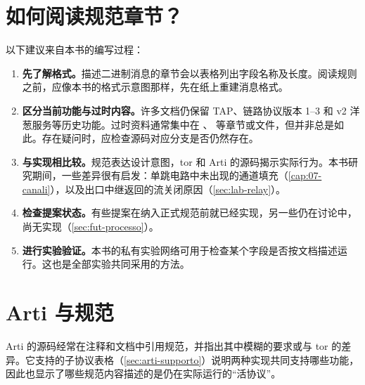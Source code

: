 \section{如何阅读规范章节？}\label{sec:C-lettura}

以下建议来自本书的编写过程：
\begin{enumerate}
  \item \textbf{先了解格式。}描述二进制消息的章节会以表格列出字段名称及长度。阅读规则之前，应像本书的格式示意图那样，先在纸上重建消息格式。
  \item \textbf{区分当前功能与过时内容。}许多文档仍保留 TAP、链路协议版本 1--3 和 v2 洋葱服务等历史功能。过时资料通常集中在 、 等章节或文件，但并非总是如此。存在疑问时，应检查源码对应分支是否仍然存在。
  \item \textbf{与实现相比较。}规范表达设计意图，tor 和 Arti 的源码揭示实际行为。本书研究期间，一些差异很有启发：单跳电路中未出现的通道填充（\cref{cap:07-canali}），以及出口中继返回的流关闭原因（\cref{sec:lab-relay}）。
  \item \textbf{检查提案状态。}有些提案在纳入正式规范前就已经实现，另一些仍在讨论中，尚无实现（\cref{sec:fut-processo}）。
  \item \textbf{进行实验验证。}本书的私有实验网络可用于检查某个字段是否按文档描述运行。这也是全部实验共同采用的方法。
\end{enumerate}

\section{Arti 与规范}\label{sec:C-arti}

Arti 的源码经常在注释和文档中引用规范，并指出其中模糊的要求或与 tor 的差异。它支持的子协议表格（\cref{sec:arti-supporto}）说明两种实现共同支持哪些功能，因此也显示了哪些规范内容描述的是仍在实际运行的\enquote{活协议}。
